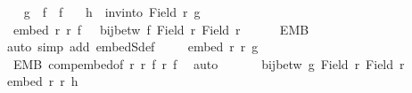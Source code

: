 \begin{isabellebody}
%
\isadelimproof
%
\endisadelimproof
%
\isatagproof
{}\isamarkupfalse%
{\isacharminus}{\kern0pt}\isanewline
\ \ \isamarkupfalse%
\ {\isacharquery}{\kern0pt}g\ {\isacharequal}{\kern0pt}\ {\isachardoublequoteopen}{\isacharparenleft}{\kern0pt}f{\isacharprime}{\kern0pt}\ {\isasymcirc}\ f{\isacharparenright}{\kern0pt}{\isachardoublequoteclose}\ \ \isamarkupfalse%
\ {\isacharquery}{\kern0pt}h\ {\isacharequal}{\kern0pt}\ {\isachardoublequoteopen}inv{\isacharunderscore}{\kern0pt}into\ {\isacharparenleft}{\kern0pt}Field\ r{\isacharparenright}{\kern0pt}\ {\isacharquery}{\kern0pt}g{\isachardoublequoteclose}\isanewline
\ \ \isamarkupfalse%
\ {}{\isacharcolon}{\kern0pt}\ {\isachardoublequoteopen}embed\ r\ r{\isacharprime}{\kern0pt}\ f\ {\isasymand}\ {\isasymnot}\ {\isacharparenleft}{\kern0pt}bij{\isacharunderscore}{\kern0pt}betw\ f\ {\isacharparenleft}{\kern0pt}Field\ r{\isacharparenright}{\kern0pt}\ {\isacharparenleft}{\kern0pt}Field\ r{\isacharprime}{\kern0pt}{\isacharparenright}{\kern0pt}{\isacharparenright}{\kern0pt}{\isachardoublequoteclose}\isanewline
\ \ \ \ \isamarkupfalse%
\ EMB\ \isamarkupfalse%
\ {\isacharparenleft}{\kern0pt}auto\ simp\ add{\isacharcolon}{\kern0pt}\ embedS{\isacharunderscore}{\kern0pt}def{\isacharparenright}{\kern0pt}\isanewline
\ \ \isamarkupfalse%
\ {}{\isacharcolon}{\kern0pt}\ {\isachardoublequoteopen}embed\ r\ r{\isacharprime}{\kern0pt}{\isacharprime}{\kern0pt}\ {\isacharquery}{\kern0pt}g{\isachardoublequoteclose}\isanewline
\ \ \ \ \isamarkupfalse%
\ \ EMB{\isacharprime}{\kern0pt}\ comp{\isacharunderscore}{\kern0pt}embed{\isacharbrackleft}{\kern0pt}of\ r\ r{\isacharprime}{\kern0pt}\ f\ r{\isacharprime}{\kern0pt}{\isacharprime}{\kern0pt}\ f{\isacharprime}{\kern0pt}{\isacharbrackright}{\kern0pt}\ \isamarkupfalse%
\ auto\isanewline
\ \ \isamarkupfalse%
\isanewline
\ \ \isacommand{{\isacharbraceleft}{\kern0pt}}\isamarkupfalse%
\isamarkupfalse%
\ {\isachardoublequoteopen}bij{\isacharunderscore}{\kern0pt}betw\ {\isacharquery}{\kern0pt}g\ {\isacharparenleft}{\kern0pt}Field\ r{\isacharparenright}{\kern0pt}\ {\isacharparenleft}{\kern0pt}Field\ r{\isacharprime}{\kern0pt}{\isacharprime}{\kern0pt}{\isacharparenright}{\kern0pt}{\isachardoublequoteclose}\isanewline
\ \ \ \ \isamarkupfalse%
\ {\isachardoublequoteopen}embed\ r{\isacharprime}{\kern0pt}{\isacharprime}{\kern0pt}\ r\ {\isacharquery}{\kern0pt}h{\isachardoublequoteclose}\ \isamarkupfalse%

\end{isabellebody}
